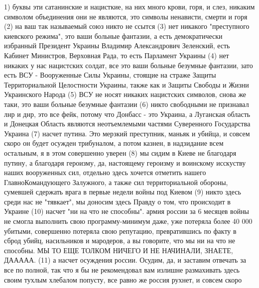  
 
 
 
 

1) буквы эти сатанинские и нацисткие, на них много крови, горя, и слез, никаким
символом объединения они не являются, это символы ненависти, смерти и горя (2)
на ваш так называемый союз никто не ссытся (3) нет никакого "преступного
киевского режима", это ваши больные фантазии, а есть демократически избранный
Президент Украины Владимир Александрович Зеленский, есть Кабинет Министров,
Верховная Рада, то есть Парламент Украины (4) нет никаких у нас нацистских
солдат, все это ваши больные безумные фантазии, зато есть ВСУ - Вооруженные
Силы Украины, стоящие на страже Защиты Территориальной Целостности Украины,
также как и Защиты Свободы и Жизни Украинского Народа (5) ВСУ не носят никаких
нацистских символов, снова же таки, это ваши больные безумные фантазии (6)
никто свободными не признавал лнр и днр, это все фейк, потому что Донбасс - это
Украина, а Луганская область и Донецкая Область являются неотъемлемыми частями
Суверенного Государства Украина (7) насчет путина. Это мерзкий преступник,
маньяк и убийца, и совсем скоро он будет осужден трибуналом, а потом казнен, в
надзидание всем остальным, я в этом совершенно уверен (8) мы сидим в Киеве не
благодаря путину, а благодаря героизму, да, настоящему героизму и воинскому
исскуству наших вооруженных сил, отдельно здесь хочется отметить нашего
ГлавноКомандующего Залужного, а также сил территориальной обороны, сумевшей
сдержать врага в первые недели войны под Киевом (9) никто здесь среди нас не
"тявкает", мы доносим здесь Правду о том, что происходит в Украине (10) насчет
"ни на что не способны". армия россии за 6 месяцев войны не смогла выполнить
свою программу-минимум даже, уже потеряла более 40 000 убитыми, совершенно
потеряла свою репутацию, превратившись по факту в сброд убийц, насильников и
мародеров, а вы говорите, что мы ни на что не способны. МЫ ТО ЕЩЕ ТОЛКОМ НИЧЕГО
И НЕ НАЧИНАЛИ, ЗНАЕТЕ, ДААААА. (11) а насчет осуждения россии. Осудим, да, и
заставим отвечать за все по полной, так что я бы не рекомендовал вам излишне
размахивать здесь своим тухлым хлебалом попусту, все равно же россия рухнет, и
совсем скоро
